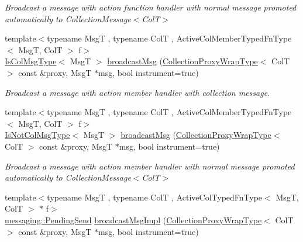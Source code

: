 \begin{DoxyCompactItemize}
\begin{DoxyCompactList}\small\item\em Broadcast a message with action function handler with normal message promoted automatically to {\ttfamily Collection\+Message$<$\+Col\+T$>$} \end{DoxyCompactList}\item 
{\footnotesize template$<$typename MsgT , typename ColT , Active\+Col\+Member\+Typed\+Fn\+Type$<$ Msg\+T, Col\+T $>$ f$>$ }\\\hyperlink{structvt_1_1vrt_1_1collection_1_1_collection_manager_a21c21612c806016788057aeab142af20}{Is\+Col\+Msg\+Type}$<$ MsgT $>$ \hyperlink{structvt_1_1vrt_1_1collection_1_1_collection_manager_a5ec1684e67f1e5aec6b94cdcf17e5777}{broadcast\+Msg} (\hyperlink{structvt_1_1vrt_1_1collection_1_1_collection_manager_a56458ed7f9bb22b631b9b3a745f42f94}{Collection\+Proxy\+Wrap\+Type}$<$ ColT $>$ const \&proxy, MsgT $\ast$msg, bool instrument=true)
\begin{DoxyCompactList}\small\item\em Broadcast a message with action member handler with collection message. \end{DoxyCompactList}\item 
{\footnotesize template$<$typename MsgT , typename ColT , Active\+Col\+Member\+Typed\+Fn\+Type$<$ Msg\+T, Col\+T $>$ f$>$ }\\\hyperlink{structvt_1_1vrt_1_1collection_1_1_collection_manager_ae376deeefd4f89a0b1c93849977715d9}{Is\+Not\+Col\+Msg\+Type}$<$ MsgT $>$ \hyperlink{structvt_1_1vrt_1_1collection_1_1_collection_manager_a42cfab20eec557ba82f70d90afa3e7a1}{broadcast\+Msg} (\hyperlink{structvt_1_1vrt_1_1collection_1_1_collection_manager_a56458ed7f9bb22b631b9b3a745f42f94}{Collection\+Proxy\+Wrap\+Type}$<$ ColT $>$ const \&proxy, MsgT $\ast$msg, bool instrument=true)
\begin{DoxyCompactList}\small\item\em Broadcast a message with action member handler with normal message promoted automatically to {\ttfamily Collection\+Message$<$\+Col\+T$>$} \end{DoxyCompactList}\item 
{\footnotesize template$<$typename MsgT , typename ColT , Active\+Col\+Typed\+Fn\+Type$<$ Msg\+T, Col\+T $>$ $\ast$ f$>$ }\\\hyperlink{structvt_1_1messaging_1_1_pending_send}{messaging\+::\+Pending\+Send} \hyperlink{structvt_1_1vrt_1_1collection_1_1_collection_manager_ac7a9c72784d76ddf0346926bbb147e8c}{broadcast\+Msg\+Impl} (\hyperlink{structvt_1_1vrt_1_1collection_1_1_collection_manager_a56458ed7f9bb22b631b9b3a745f42f94}{Collection\+Proxy\+Wrap\+Type}$<$ ColT $>$ const \&proxy, MsgT $\ast$msg, bool instrument=true)

\end{DoxyCompactItemize}
